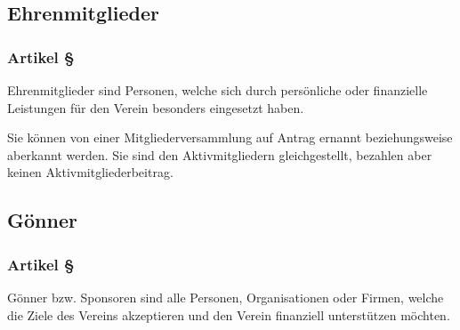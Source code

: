 \subsection{Ehrenmitglieder}

\subsubsection*{Artikel §\articlenumber}
Ehrenmitglieder sind Personen, welche sich durch persönliche oder finanzielle
Leistungen für den Verein besonders eingesetzt haben.

Sie können von einer Mitgliederversammlung auf Antrag ernannt beziehungsweise
aberkannt werden. Sie sind den Aktivmitgliedern gleichgestellt, bezahlen aber
keinen Aktivmitgliederbeitrag.

\subsection{Gönner}

\subsubsection*{Artikel §\articlenumber}
Gönner bzw. Sponsoren sind alle Personen, Organisationen oder Firmen, welche
die Ziele des Vereins akzeptieren und den Verein finanziell unterstützen möchten.
